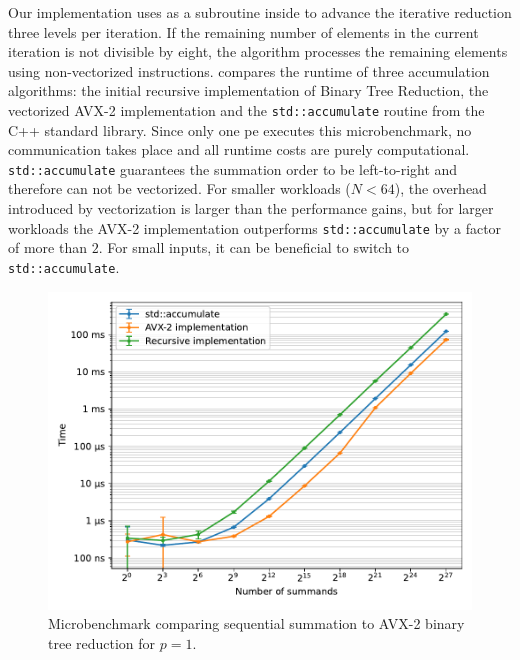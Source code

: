 Our implementation uses  as a subroutine inside  to advance the iterative reduction three levels per iteration.
If the remaining number of elements in the current iteration is not divisible by eight, the algorithm processes the remaining elements using non-vectorized instructions.
 compares the runtime of three accumulation algorithms: the initial recursive implementation of Binary Tree Reduction, the vectorized AVX-2 implementation and the \texttt{std::accumulate} routine from the C++ standard library.
Since only one \gls{pe} executes this microbenchmark, no communication takes place and all runtime costs are purely computational.
\texttt{std::accumulate} guarantees the summation order to be left-to-right and therefore can not be vectorized.
For smaller workloads ($N < 64$), the overhead introduced by vectorization is larger than the performance gains, but for larger workloads the AVX-2 implementation outperforms \texttt{std::accumulate} by a factor of more than $2$.
For small inputs, it can be beneficial to switch to \texttt{std::accumulate}.
\begin{figure}[h!]
\centering
\includegraphics[scale=0.72]{figures/benchmarkVectorization}
\caption{Microbenchmark comparing sequential summation to AVX-2 binary tree reduction for $p=1$.}
\label{fig:benchmarkVectorization}
\end{figure}
